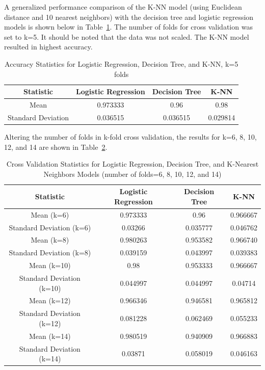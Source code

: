 \documentclass[journal]{IEEEtran}
\begin{document}
A generalized performance comparison of the K-NN model (using Euclidean distance and 10 nearest neighbors) with the decision tree and logistic regression models is shown below in Table~\ref{table:stats3models}. The number of folds for cross validation was set to k=5. It should be noted that the data was not scaled. The K-NN model resulted in highest accuracy.  

\begin{table}[h!]
\centering
\begin{tabular}{ c | c c c }
Statistic & Logistic Regression & Decision Tree & K-NN \\
\hline
Mean & 0.973333 & 0.96 & 0.98 \\
Standard Deviation & 0.036515 & 0.036515 & 0.029814 \\
\end{tabular}
\caption{Accuracy Statistics for Logistic Regression, Decision Tree, and K-NN, k=5 folds}
\label{table:stats3models}
\end{table}


Altering the number of folds in k-fold cross validation, the results for k=6, 8, 10, 12, and 14 are shown in Table~\ref{table:MultiFoldCV}.

\begin{table}[h!]
\centering
\begin{tabular}{ c | c c c }
Statistic & Logistic Regression & Decision Tree & K-NN \\
\hline
Mean (k=6) & 0.973333 & 0.96 & 0.966667 \\
Standard Deviation (k=6)  & 0.03266 & 0.035777 & 0.046762 \\
Mean (k=8) & 0.980263 & 0.953582 & 0.966740 \\
Standard Deviation (k=8)  & 0.039159 & 0.043997 & 0.039383 \\
Mean (k=10) & 0.98 & 0.953333 & 0.966667 \\
Standard Deviation (k=10)  & 0.044997 & 0.044997 & 0.04714 \\
Mean (k=12) & 0.966346 & 0.946581 & 0.965812 \\
Standard Deviation (k=12)  & 0.081228 & 0.062469 & 0.055233 \\
Mean (k=14) & 0.980519 & 0.940909 & 0.966883 \\
Standard Deviation (k=14)  & 0.03871 & 0.058019 & 0.046163 \\
\end{tabular}
\caption{Cross Validation Statistics for Logistic Regression, Decision Tree, and K-Nearest Neighbors Models (number of folds=6, 8, 10, 12, and 14)}
\label{table:MultiFoldCV}
\end{table}
\end{document}
